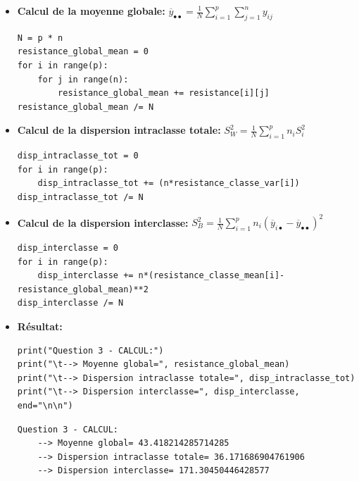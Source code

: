 \begin{itemize}
    \item \textbf{Calcul de la moyenne globale:}  $\overline{y}_{\bullet\bullet}=\frac{1}{N} \sum^{p}_{i=1} \sum^{n}_{j=1} y_{ij}$ \\
    \begin{lstlisting}[style=myPython, caption=Calcul de la moyenne globale, frame=lines]
N = p * n
resistance_global_mean = 0
for i in range(p):
    for j in range(n):
        resistance_global_mean += resistance[i][j]
resistance_global_mean /= N
\end{lstlisting}
    
    \item \textbf{Calcul de la dispersion intraclasse totale:}  $S_{W}^{2}=\frac{1}{N} \sum^{p}_{i=1} n_{i}S_{i}^{2}$ \\
    \begin{lstlisting}[style=myPython, caption=Calcul de la dispersion intraclasse totale, frame=lines]
disp_intraclasse_tot = 0
for i in range(p):
    disp_intraclasse_tot += (n*resistance_classe_var[i])
disp_intraclasse_tot /= N
\end{lstlisting}
    
    \item \textbf{Calcul de la dispersion interclasse:}  $S_{B}^{2}=\frac{1}{N} \sum^{p}_{i=1} n_{i}(\overline{y}_{i\bullet}-\overline{y}_{\bullet\bullet})^{2}$ \\
    \begin{lstlisting}[style=myPython, caption=Calcul de la dispersion interclasse, frame=lines]
disp_interclasse = 0
for i in range(p):
    disp_interclasse += n*(resistance_classe_mean[i]-resistance_global_mean)**2
disp_interclasse /= N
\end{lstlisting}

    \item \textbf{Résultat:} \\
    \begin{lstlisting}[style=myPython, caption=Affichage du résultat, frame=lines]
print("Question 3 - CALCUL:")
print("\t--> Moyenne global=", resistance_global_mean)
print("\t--> Dispersion intraclasse totale=", disp_intraclasse_tot)
print("\t--> Dispersion interclasse=", disp_interclasse, end="\n\n")
\end{lstlisting}

    \begin{lstlisting}[style=myLog, caption=Résultat, frame=lines]
Question 3 - CALCUL:
    --> Moyenne global= 43.418214285714285
    --> Dispersion intraclasse totale= 36.171686904761906
    --> Dispersion interclasse= 171.30450446428577
\end{lstlisting}

\end{itemize}

